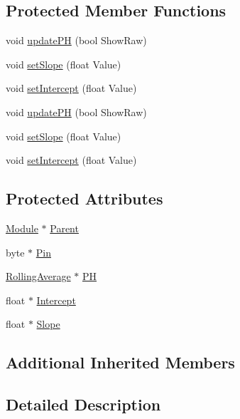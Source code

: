 \subsection*{Protected Member Functions}
\begin{DoxyCompactItemize}
\item 
void \hyperlink{class_p_h_sensor_aefd9f4f73636b8827a22b8246cbc4dee}{update\+PH} (bool Show\+Raw)
\item 
void \hyperlink{class_p_h_sensor_ae9b41f458fafd9ae475d9bfbbb27f8d5}{set\+Slope} (float Value)
\item 
void \hyperlink{class_p_h_sensor_a41bd303fbad556aaf714da2f0bf4a69c}{set\+Intercept} (float Value)
\item 
void \hyperlink{class_p_h_sensor_aefd9f4f73636b8827a22b8246cbc4dee}{update\+PH} (bool Show\+Raw)
\item 
void \hyperlink{class_p_h_sensor_ae9b41f458fafd9ae475d9bfbbb27f8d5}{set\+Slope} (float Value)
\item 
void \hyperlink{class_p_h_sensor_a41bd303fbad556aaf714da2f0bf4a69c}{set\+Intercept} (float Value)
\end{DoxyCompactItemize}
\subsection*{Protected Attributes}
\begin{DoxyCompactItemize}
\item 
\hyperlink{class_module}{Module} $\ast$ \hyperlink{class_p_h_sensor_ac969f556dfd81281095f4b3af97105c6}{Parent}
\item 
byte $\ast$ \hyperlink{class_p_h_sensor_a400121c893947d089df13373f5bd908c}{Pin}
\item 
\hyperlink{class_rolling_average}{Rolling\+Average} $\ast$ \hyperlink{class_p_h_sensor_afb34dcf01c73122064cabd52056a5b24}{PH}
\item 
float $\ast$ \hyperlink{class_p_h_sensor_a9630af0220d3754863e93965ac8e6d5a}{Intercept}
\item 
float $\ast$ \hyperlink{class_p_h_sensor_a5779881cfbad7c625ad536aaa031bfc3}{Slope}
\end{DoxyCompactItemize}
\subsection*{Additional Inherited Members}


\subsection{Detailed Description}


